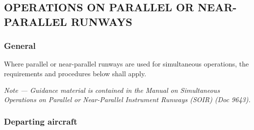 \documentclass[../main.tex]{subfiles}
\begin{document}
    \subsection[Operations on parallel or near-parallel runways]{OPERATIONS ON PARALLEL OR NEAR-PARALLEL RUNWAYS}

    \subsubsection{General}

    Where parallel or near-parallel runways are used for simultaneous operations, the requirements and procedures below shall apply.

    \textit{Note --- Guidance material is contained in the \emph{Manual on Simultaneous Operations on Parallel or Near-Parallel Instrument Runways (SOIR)} (Doc 9643).}

    \subsubsection{Departing aircraft}
\end{document}
